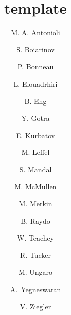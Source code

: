 \title{template}

\author[A]{M. A. Antonioli}
\author[A]{S. Boiarinov}
\author[A]{P. Bonneau}
\author[A]{L. Elouadrhiri}
\author[A]{B. Eng}
\author[A]{Y. Gotra}
\author[B]{E. Kurbatov}
\author[A]{M. Leffel}
\author[A]{S. Mandal}
\author[A]{M. McMullen}
\author[B]{M. Merkin}
\author[A]{B. Raydo}
\author[A]{W. Teachey}
\author[C]{R. Tucker}
\author[A]{M. Ungaro}
\author[A]{A.~Yegneswaran}
\author[A]{V. Ziegler}

\address[A]{Thomas Jefferson National Accelerator Facility, Newport News, VA, USA}
\address[B]{Skobeltsyn Institute of Nuclear Physics, Moscow State University, Moscow, Russia}
\address[C]{Arizona State University, Tempe, AZ}

